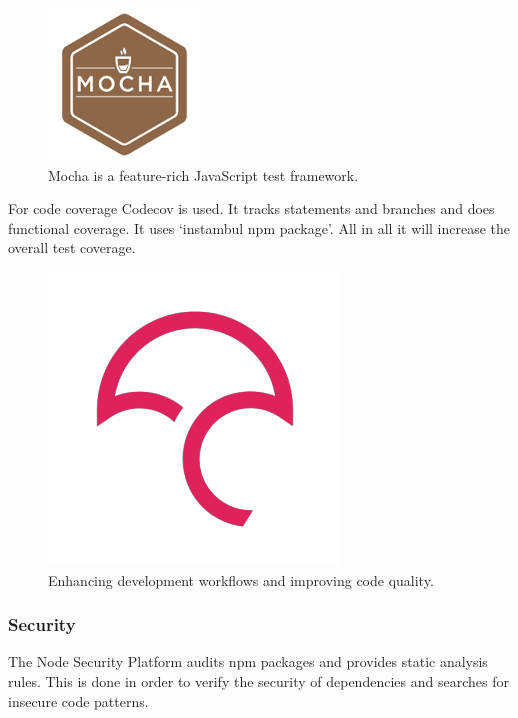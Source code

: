 \begin{figure}[h]
  \begin{center}
    \includegraphics[scale=0.5]{./images/mocha.png}
    \caption{Mocha is a feature-rich JavaScript test framework.}
    \label{fig:}
  \end{center}
\end{figure}

For code coverage Codecov is used. It tracks statements and branches and does functional coverage. It uses `instambul npm package'. All in all it will increase the overall test coverage.

\begin{figure}[h]
  \begin{center}
    \includegraphics[scale=0.5]{./images/codecov.png}
    \caption{Enhancing development workflows and improving code quality.}
    \label{fig:}
  \end{center}
\end{figure}


\subsubsection{Security}
The Node Security Platform audits npm packages and provides static analysis rules. This is done in order to verify the security of dependencies and searches for insecure code patterns.

